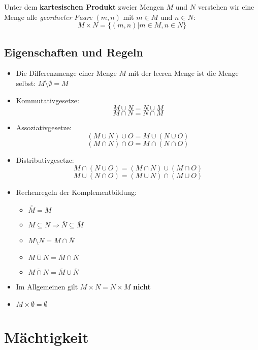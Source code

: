 \documentclass[../../main.tex]{subfiles}
\begin{document}
	\begin{definition}
		Unter dem \textbf{kartesischen Produkt} zweier Mengen $M$ und $N$ verstehen wir eine Menge alle \textit{geordneter Paare}  $(m, n)$ mit $m \in M$ und $n \in N$: $$M \times N = \{(m,n) | m \in M, n \in N \}$$
	\end{definition}

	\subsection*{Eigenschaften und Regeln}
	\begin{itemize}
		\item Die Differenzmenge einer Menge $M$ mit der leeren Menge ist die Menge selbst: $M \setminus \emptyset = M$
		\item Kommutativgesetze: $$M \cup N = N \cup M$$ $$M \cap N = N \cap M$$
		\item Assoziativgesetze: $$(M \cup N) \cup O = M \cup (N \cup O)$$ $$(M \cap N) \cap O = M \cap (N \cap O)$$
		\item Distributivgesetze: $$M \cap (N \cup O) = (M \cap N) \cup (M \cap O)$$ $$M \cup (N \cap O) = (M \cup N) \cap (M \cup O)$$
		\item Rechenregeln der Komplementbildung:
		\begin{itemize}
			\item $\overline{\overline{M}} = M$
			\item $M \subseteq N \Rightarrow \overline{N} \subseteq \overline{M}$
			\item $M \setminus N = M \cap \overline{N}$
			\item $\overline{M \cup N} = \overline{M} \cap \overline{N}$
			\item $\overline{M \cap N} = \overline{M} \cup \overline{N}$
		\end{itemize}
		\item Im Allgemeinen gilt $M \times N = N \times M$ \textbf{nicht}
		\item $M \times \emptyset = \emptyset$
	\end{itemize}

	\section{Mächtigkeit}
	
\end{document}
